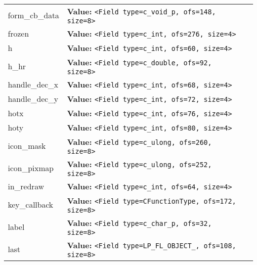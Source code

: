 \begin{longtable}{|p{\varnamewidth}|p{\vardescrwidth}|l}
\cline{1-2}
\raggedright f\-o\-r\-m\-\_\-c\-b\-\_\-d\-a\-t\-a\- & \raggedright \textbf{Value:} 
{\tt {\textless}Field type=c\_void\_p, ofs=148, size=8{\textgreater}}&\\
\cline{1-2}
\raggedright f\-r\-o\-z\-e\-n\- & \raggedright \textbf{Value:} 
{\tt {\textless}Field type=c\_int, ofs=276, size=4{\textgreater}}&\\
\cline{1-2}
\raggedright h\- & \raggedright \textbf{Value:} 
{\tt {\textless}Field type=c\_int, ofs=60, size=4{\textgreater}}&\\
\cline{1-2}
\raggedright h\-\_\-h\-r\- & \raggedright \textbf{Value:} 
{\tt {\textless}Field type=c\_double, ofs=92, size=8{\textgreater}}&\\
\cline{1-2}
\raggedright h\-a\-n\-d\-l\-e\-\_\-d\-e\-c\-\_\-x\- & \raggedright \textbf{Value:} 
{\tt {\textless}Field type=c\_int, ofs=68, size=4{\textgreater}}&\\
\cline{1-2}
\raggedright h\-a\-n\-d\-l\-e\-\_\-d\-e\-c\-\_\-y\- & \raggedright \textbf{Value:} 
{\tt {\textless}Field type=c\_int, ofs=72, size=4{\textgreater}}&\\
\cline{1-2}
\raggedright h\-o\-t\-x\- & \raggedright \textbf{Value:} 
{\tt {\textless}Field type=c\_int, ofs=76, size=4{\textgreater}}&\\
\cline{1-2}
\raggedright h\-o\-t\-y\- & \raggedright \textbf{Value:} 
{\tt {\textless}Field type=c\_int, ofs=80, size=4{\textgreater}}&\\
\cline{1-2}
\raggedright i\-c\-o\-n\-\_\-m\-a\-s\-k\- & \raggedright \textbf{Value:} 
{\tt {\textless}Field type=c\_ulong, ofs=260, size=8{\textgreater}}&\\
\cline{1-2}
\raggedright i\-c\-o\-n\-\_\-p\-i\-x\-m\-a\-p\- & \raggedright \textbf{Value:} 
{\tt {\textless}Field type=c\_ulong, ofs=252, size=8{\textgreater}}&\\
\cline{1-2}
\raggedright i\-n\-\_\-r\-e\-d\-r\-a\-w\- & \raggedright \textbf{Value:} 
{\tt {\textless}Field type=c\_int, ofs=64, size=4{\textgreater}}&\\
\cline{1-2}
\raggedright k\-e\-y\-\_\-c\-a\-l\-l\-b\-a\-c\-k\- & \raggedright \textbf{Value:} 
{\tt {\textless}Field type=CFunctionType, ofs=172, size=8{\textgreater}}&\\
\cline{1-2}
\raggedright l\-a\-b\-e\-l\- & \raggedright \textbf{Value:} 
{\tt {\textless}Field type=c\_char\_p, ofs=32, size=8{\textgreater}}&\\
\cline{1-2}
\raggedright l\-a\-s\-t\- & \raggedright \textbf{Value:} 
{\tt {\textless}Field type=LP\_FL\_OBJECT\_, ofs=108, size=8{\textgreater}}&\\

\end{longtable}
